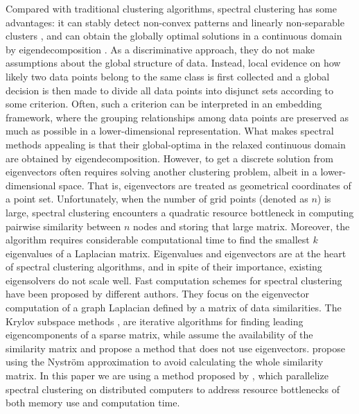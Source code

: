 \documentclass[12pt,letterpaper]{article}
\begin{document}
Compared with traditional clustering algorithms, spectral clustering has some advantages: it can stably detect 
non-convex patterns and linearly non-separable clusters \citep{Sakai2009}, and can obtain the globally optimal 
solutions in a continuous domain by eigendecomposition  \citep{Archip2005}. As a discriminative approach, they 
do not make assumptions about the global structure of data. 
Instead, local evidence on how likely two data points belong to the same class is first collected and a global decision 
is then made to divide all data points into disjunct sets according to some criterion. Often, such a criterion can be
interpreted in an embedding framework, where the grouping relationships among data points are preserved as much
as possible in a lower-dimensional representation. What makes spectral methods appealing is that their global-optima 
in the relaxed continuous domain are obtained by eigendecomposition. However, to get a discrete solution from eigenvectors
often requires solving another clustering problem, albeit in a lower-dimensional space. That is, eigenvectors are treated as 
geometrical coordinates of a point set. Unfortunately, when the number of grid points (denoted as $n$) is large, spectral 
clustering encounters a quadratic resource bottleneck in computing pairwise similarity between $n$ nodes and storing 
that large matrix. Moreover, the algorithm requires considerable computational time to find the smallest $k$ eigenvalues of 
a Laplacian matrix. Eigenvalues and eigenvectors are at the heart of spectral clustering algorithms, and in spite of their 
importance, existing eigensolvers do not scale well. Fast computation schemes for spectral clustering have been proposed 
by  different authors. They focus on the eigenvector computation of a graph Laplacian defined by a matrix of data similarities.
The Krylov subspace methods \citep{Mahadevan2008}, are iterative algorithms for finding leading eigencomponents of a sparse 
matrix, while \cite{Dhillon2007} assume the availability of the similarity matrix and propose a method that does not use eigenvectors.
\cite{Fowlkes2004} propose using the Nystr\"{o}m approximation to avoid calculating the whole similarity matrix. In this paper we are 
using a method proposed by \cite{Song2008}, which parallelize spectral clustering on distributed computers to address
resource bottlenecks of both memory use and computation time.
\end{document}
